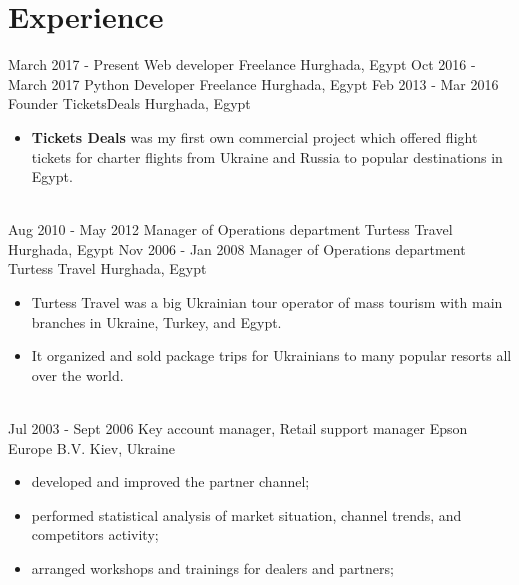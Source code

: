 \documentclass[letterpaper]{twentysecondcv} %
\begin{document}

\section{Experience}

\begin{twenty} %
	\twentyitem
    	{March 2017 -}
		{Present}
        {Web developer}
        {Freelance}
        {Hurghada, Egypt}
        {}
	\twentyitem
    	{Oct 2016 -}
		{March 2017}
        {Python Developer}
        {Freelance}
        {Hurghada, Egypt}
        {}
    \twentyitem
   		{Feb 2013 -}
		{Mar 2016}
        {Founder}
        {TicketsDeals}
        {Hurghada, Egypt}
        {
        {\begin{itemize}
        	\item \textbf{Tickets Deals} was my first own commercial project which
        	offered flight tickets for charter flights from Ukraine and Russia to
        	popular destinations in Egypt.
        \end{itemize}}
        }
     \\
     \twentyitem
   		{Aug 2010 - }
		{May 2012}
		{Manager of Operations department}
        {Turtess Travel}
        {Hurghada, Egypt}
        {}
    \twentyitem
   		{Nov 2006 - }
		{Jan 2008}
		{Manager of Operations department}
        {Turtess Travel}
        {Hurghada, Egypt}
        {
        \begin{itemize}
        	\item Turtess Travel was a big Ukrainian tour operator of mass tourism with main
        	branches in Ukraine, Turkey, and Egypt.
        	\item It organized and sold package trips for Ukrainians to many popular resorts
			all over the world.
        \end{itemize}
    	}
    	\\
    \twentyitem
   		{Jul 2003 - }
		{Sept 2006}
        {Key account manager, Retail support manager}
        {Epson Europe B.V.}
        {Kiev, Ukraine}
        {
        \begin{itemize}
        	\item developed and improved the partner channel;
			\item performed statistical analysis of market situation, channel trends,
			and competitors activity;
			\item arranged workshops and trainings for dealers and partners;
        \end{itemize}
    	}
\end{twenty}
\end{document}
